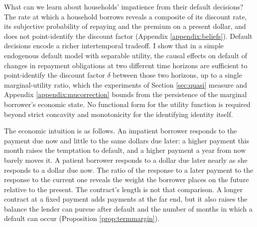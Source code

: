 What can we learn about households' impatience from their default decisions? The rate at which a household borrows reveals a composite of its discount rate, its subjective probability of repaying and the premium on a present dollar, and does not point-identify the discount factor (Appendix \ref{appendix:beliefs}). Default decisions encode a richer intertemporal tradeoff. I show that in a simple endogenous default model with separable utility, the causal effects on default of changes in repayment obligations at two different time horizons are sufficient to point-identify the discount factor $\delta$ between those two horizons, up to a single marginal-utility ratio, which the experiments of Section \ref{sec:quasi} measure and Appendix \ref{appendix:mucorrection} bounds from the persistence of the marginal borrower's economic state. No functional form for the utility function is required beyond strict concavity and monotonicity for the identifying identity itself.

The economic intuition is as follows. An impatient borrower responds to the payment due now and little to the same dollars due later: a higher payment this month raises the temptation to default, and a higher payment a year from now barely moves it. A patient borrower responds to a dollar due later nearly as she responds to a dollar due now. The ratio of the response to a later payment to the response to the current one reveals the weight the borrower places on the future relative to the present. The contract's length is not that comparison. A longer contract at a fixed payment adds payments at the far end, but it also raises the balance the lender can pursue after default and the number of months in which a default can occur (Proposition \ref{prop:termmargin}).

